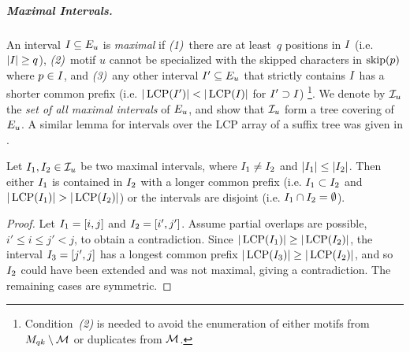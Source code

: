 \subparagraph*{Maximal Intervals.}
%
An interval $I_{} \subseteq E_{u}$ is \emph{maximal} if \emph{(1)}~there are at least~$q$ positions in $I_{}$ (i.e. $|I_{}| \geq q$), \emph{(2)}~motif $u$ cannot be specialized with the skipped characters in $\operatorname{skip}(p)$ where $p \in I_{}$, and \emph{(3)}~any other interval $I_{}' \subseteq E_{u}$ that strictly contains $I_{}$ has a shorter common prefix (i.e. $|\operatorname{LCP}(I_{}')| < |\operatorname{LCP}(I_{})|$ for $I_{}' \supset I_{}$) \footnote{%
Condition~\emph{(2)} is needed to avoid the enumeration of either motifs from $M_{qk} \setminus \mathcal{M}$ or duplicates from $\mathcal{M}$.}.
We denote by $\mathcal{I}_{u}$ the \emph{set of all maximal intervals} of $E_{u}$, and show that $\mathcal{I}_{u}$ form a tree covering of $E_{u}$. A similar lemma for intervals over the LCP array of a suffix tree was given in \cite{abouelhoda2004replacing}.
\begin{lemma}
  \label{lem:intOverlap}
    Let $I_{1}, I_{2} \in \mathcal{I}_{u}$ be two maximal intervals, where $I_{1} \not = I_{2}$ and $|I_{1}| \leq  |I_{2}|$.
    Then either $I_{1}$ is contained in $I_{2}$ with a longer common prefix (i.e. $I_{1} \subset I_{2}$ and $|\operatorname{LCP}(I_{1})| > |\operatorname{LCP}(I_{2})|$) or the intervals are disjoint (i.e. $I_{1} \cap I_{2} = \emptyset$). 
\end{lemma}
\begin{proof}
    Let $I_{1} = [i, j]$ and $I_{2} = [i', j']$. 
    Assume partial overlaps are possible, $i' \leq i \leq j' < j$, to obtain a contradiction.
    Since $|\operatorname{LCP}(I_{1})| \geq |\operatorname{LCP}(I_{2})|$, the interval $I_{3} = [j', j]$ has a longest common prefix $|\operatorname{LCP}(I_{3})| \geq |\operatorname{LCP}(I_{2})|$, and so $I_{2}$ could have been extended and was not maximal, giving a contradiction. 
    The remaining cases are symmetric.
\end{proof}

